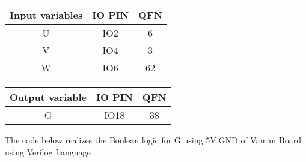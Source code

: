 \documentclass[10pt, a4paper]{article}
\begin{document}
\begin{center}
\begin{tabular}{|c|c|c|}
\hline
\textbf{Input variables}&\textbf{IO PIN}&\textbf{QFN}\\
\hline
U & IO2&6\\  
\hline
V & IO4 &3\\ 
\hline
W & IO6 &62\\
\hline
\end{tabular}
\end{center}
\begin{center}
\begin{tabular}{|c|c|c|}
\hline
\textbf{Output variable}&\textbf{IO PIN}&\textbf{QFN}\\
\hline
G & IO18 &38\\  
\hline
\end{tabular}
\end{center}
The code below realizes the Boolean logic for G  using 5V,GND of Vaman Board using Verilog Language
\begin{center}
\end{center}
\end{document}
